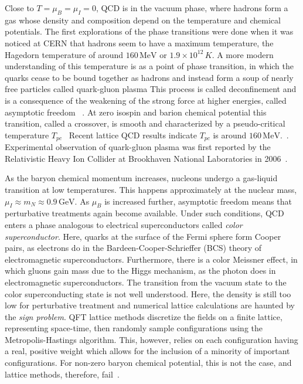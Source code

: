 Close to $T = \mu_B = \mu_I = 0$, QCD is in the vacuum phase, where hadrons form a gas whose density and composition depend on the temperature and chemical potentials.
The first explorations of the phase transitions were done when it was noticed at CERN that hadrons seem to have a maximum temperature, the Hagedorn temperature of around $160\,\text{MeV}$ or $1.9\times 10^{12} \, K$.
A more modern understanding of this temperature is as a point of phase transition, in which the quarks cease to be bound together as hadrons and instead form a soup of nearly free particles called quark-gluon plasma
This process is called deconfinement and is a consequence of the weakening of the strong force at higher energies, called asymptotic freedom
~\autocite{hagedornHadronicMatterBoiling1968,cabibboExponentialHadronicSpectrum1975}.
At zero isospin and barion chemical potential this transition, called a crossover, is smooth and characterized by a pseudo-critical temperature $T_{pc}$~\autocite{fukushimaPhaseDiagramDense2010}
Recent lattice QCD results indicate $T_{pc}$ is around $160\, \text{MeV}$.~\autocite{borsanyiThereStillAny2010}.
Experimental observation of quark-gluon plasma was first reported by the Relativistic Heavy Ion Collider at Brookhaven National Laboratories in 2006~\autocite{adcoxFormationDensePartonic2005,backPHOBOSPerspectiveDiscoveries2005}.

As the baryon chemical momentum increases, nucleons undergo a gas-liquid transition at low temperatures.
This happens approximately at the nuclear mass, $\mu_I \approx m_N \approx 0.9 \, \text{GeV}$.
As $\mu_B$ is increased further, asymptotic freedom means that perturbative treatments again become available.
Under such conditions, QCD enters a phase analogous to electrical superconductors called \emph{color superconductor}.
Here, quarks at the surface of the Fermi sphere form Cooper pairs, as electrons do in the Bardeen-Cooper-Schrieffer (BCS) theory of electromagnetic superconductors.
Furthermore, there is a color Meissner effect, in which gluons gain mass due to the Higgs mechanism, as the photon does in electromagnetic superconductors.
The transition from the vacuum state to the color superconducting state is not well understood.
Here, the density is still too low for perturbative treatment and numerical lattice calculations are haunted by the \emph{sign problem}.
QFT lattice methods discretize the fields on a finite lattice, representing space-time, then randomly sample configurations using the Metropolis-Hastings algorithm.
This, however, relies on each configuration having a real, positive weight which allows for the inclusion of a minority of important configurations.
For non-zero baryon chemical potential, this is not the case, and lattice methods, therefore, fail~\autocite{troyerComputationalComplexityFundamental2005}.

